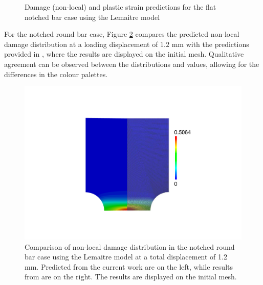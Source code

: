 \documentclass[sn-mathphys,Numbered]{sn-jnl}%
\begin{document}
\begin{figure}[htb]
	\centering
	\caption{Damage (non-local) and plastic strain predictions for the flat notched bar case using the Lemaitre model}
	\label{fig:lemaitre_point_values_flat}
\end{figure}

For the notched round bar case, Figure \ref{fig:lemaitre_damage_field} compares the predicted non-local damage distribution at a loading displacement of $1.2$ mm with the predictions provided in \citet{cesar_de_sa_damage_2006}, where the results are displayed on the initial mesh.
Qualitative agreement can be observed between the distributions and values, allowing for the differences in the colour palettes.
\begin{figure}[htbp]
	\centering
		\includegraphics[height=0.4\textwidth]{./Figures/LemaitreCompare/axi_lemaitre_compare}
		\caption{Comparison of non-local damage distribution in the notched round bar case using the Lemaitre model at a total displacement of 1.2 mm. Predicted from the current work are on the left, while results from \citet{cesar_de_sa_damage_2006} are on the right. The results are displayed on the initial mesh.}
	\label{fig:lemaitre_damage_field}
\end{figure}
\end{document}
